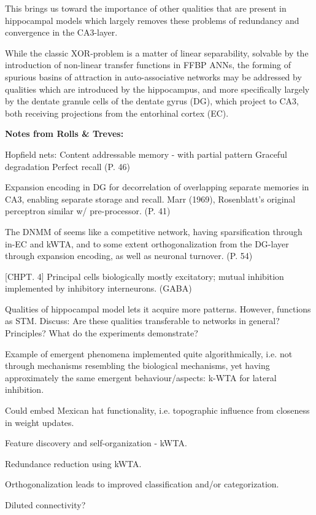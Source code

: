 This brings us toward the importance of other qualities that are present in hippocampal models which largely removes these problems of redundancy and convergence in the CA3-layer.

While the classic XOR-problem is a matter of linear separability, solvable by the introduction of non-linear transfer functions in FFBP ANNs, the forming of spurious basins of attraction in auto-associative networks may be addressed by qualities which are introduced by the hippocampus, and more specifically largely by the dentate granule cells of the dentate gyrus (DG), which project to CA3, both receiving projections from the entorhinal cortex (EC).

\textbf{Notes from Rolls \& Treves:}


Hopfield nets:
Content addressable memory - with partial pattern
Graceful degradation
Perfect recall (P. 46)

Expansion encoding in DG for decorrelation of overlapping separate memories in CA3, enabling separate storage and recall. Marr (1969), Rosenblatt's original perceptron similar w/ pre-processor. (P. 41)

The DNMM of \cite{Hattori2014} seems like a competitive network, having sparsification through in-EC and kWTA, and to some extent orthogonalization from the DG-layer through expansion encoding, as well as neuronal turnover. (P. 54)

[CHPT. 4]
Principal cells biologically mostly excitatory; mutual inhibition implemented by inhibitory interneurons. (GABA)

Qualities of hippocampal model lets it acquire more patterns. However, functions as STM. Discuss: Are these qualities transferable to networks in general? Principles? What do the experiments demonstrate?

Example of emergent phenomena implemented quite algorithmically, i.e. not through mechanisms resembling the biological mechanisms, yet having approximately the same emergent behaviour/aspects: k-WTA for lateral inhibition.

Could embed Mexican hat functionality, i.e. topographic influence from closeness in weight updates.

Feature discovery and self-organization - kWTA.

Redundance reduction using kWTA.

Orthogonalization leads to improved classification and/or categorization.

Diluted connectivity?

